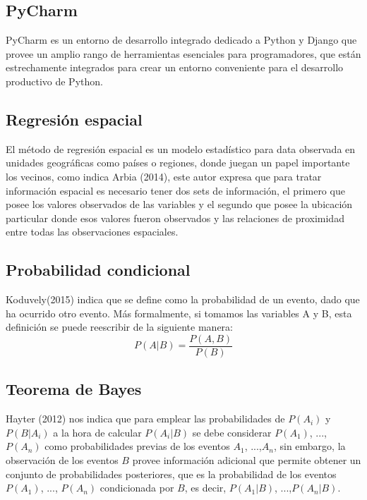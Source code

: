 \subsection{PyCharm}
PyCharm es un entorno de desarrollo integrado dedicado a Python y Django que provee un amplio rango de herramientas esenciales para programadores, que están estrechamente integrados para crear un entorno conveniente para el desarrollo productivo de Python.

\subsection{Regresión espacial}

El método de regresión espacial es un modelo estadístico para data observada en unidades geográficas como países o regiones, donde juegan un papel importante los vecinos, como indica Arbia (2014), este autor expresa que para tratar información espacial es necesario tener dos sets de información, el primero que posee los valores observados de las variables y el segundo que posee la ubicación particular donde esos valores fueron observados y las relaciones de proximidad entre todas las observaciones espaciales.

\subsection{Probabilidad condicional}

Koduvely(2015) indica que se define como la probabilidad de un evento, dado que ha ocurrido otro evento. Más formalmente, si tomamos las variables A y B, esta definición se puede reescribir de la siguiente manera:
	\[P\left(A|B\right)=\frac{P\left(A,B\right)}{P\left(B\right)}
\]

\subsection{Teorema de Bayes}

Hayter (2012) nos indica que para emplear las probabilidades de $P\left(A_{i}\right)$ y $P\left(B|A_{i}\right)$ a la hora de calcular $P\left(A_{i}|B\right)$ se debe considerar  $P\left(A_{1}\right)$, ..., $P\left(A_{n}\right)$ como probabilidades previas de los eventos $A_{1}$, ...,$A_{n}$, sin embargo, la observación de los eventos $B$ provee información adicional que permite obtener un conjunto de probabilidades posteriores, que es la probabilidad de los eventos $P\left(A_{1}\right)$, ..., $P\left(A_{n}\right)$ condicionada por $B$, es decir, $P\left(A_{1}|B\right)$, ...,$P\left(A_{n}|B\right)$.\\

